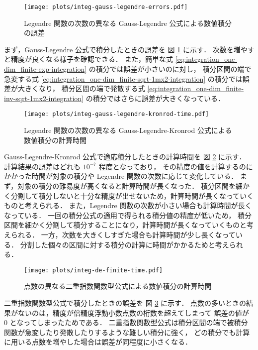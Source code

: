 \begin{figure}[tp]
    \centering
    \texttt{[image: plots/integ-gauss-legendre-errors.pdf]}
    \caption{Legendre 関数の次数の異なる Gauss-Legendre 公式による数値積分の誤差}
    \label{fig:integration_one-dim_finite_gauss-legendre-errors}
\end{figure}

まず，Gauss-Legendre 公式で積分したときの誤差を
図 \ref{fig:integration_one-dim_finite_gauss-legendre-errors} に示す．
次数を増やすと精度が良くなる様子を確認できる．
また，簡単な式 \eqref{eq:integration_one-dim_finite-exp-integration} の積分では誤差が小さいのに対し，
積分区間の端で急変する式 \eqref{eq:integration_one-dim_finite-sqrt-1mx2-integration} の積分では誤差が大きくなり，
積分区間の端で発散する式 \eqref{eq:integration_one-dim_finite-inv-sqrt-1mx2-integration} の積分ではさらに誤差が大きくなっている．

\begin{figure}[tp]
    \centering
    \texttt{[image: plots/integ-gauss-legendre-kronrod-time.pdf]}
    \caption{Legendre 関数の次数の異なる Gauss-Legendre-Kronrod 公式による数値積分の計算時間}
    \label{fig:integration_one-dim_finite_gauss-legendre-kronrod-time}
\end{figure}

Gauss-Legendre-Kronrod 公式で適応積分したときの計算時間を
図 \ref{fig:integration_one-dim_finite_gauss-legendre-kronrod-time} に示す．
計算結果の誤差はどれも $10^{-7}$ 程度となっており，
その精度の値を計算するのにかかった時間が対象の積分や Legendre 関数の次数に応じて変化している．
まず，対象の積分の難易度が高くなると計算時間が長くなった．
積分区間を細かく分割して積分しないと十分な精度が出せないため，計算時間が長くなっていくものと考えられる．
また，Legendre 関数の次数が小さい場合も計算時間が長くなっている．
一回の積分公式の適用で得られる積分値の精度が低いため，
積分区間を細かく分割して積分することになり，計算時間が長くなっていくものと考えられる．
一方，次数を大きくしすぎた場合も計算時間が少し長くなっている．
分割した個々の区間に対する積分の計算に時間がかかるためと考えられる．

\begin{figure}[tp]
    \centering
    \texttt{[image: plots/integ-de-finite-time.pdf]}
    \caption{点数の異なる二重指数関数型公式による数値積分の計算時間}
    \label{fig:integration_one-dim_finite_de-errors}
\end{figure}

二重指数関数型公式で積分したときの誤差を
図 \ref{fig:integration_one-dim_finite_de-errors} に示す．
点数の多いときの結果がないのは，精度が倍精度浮動小数点数の桁数を超えてしまって
誤差の値が 0 となってしまったためである．
二重指数関数型公式は積分区間の端で被積分関数が急変したり発散したりするような難しい積分に強く，
どの積分でも計算に用いる点数を増やした場合は誤差が同程度に小さくなる．

